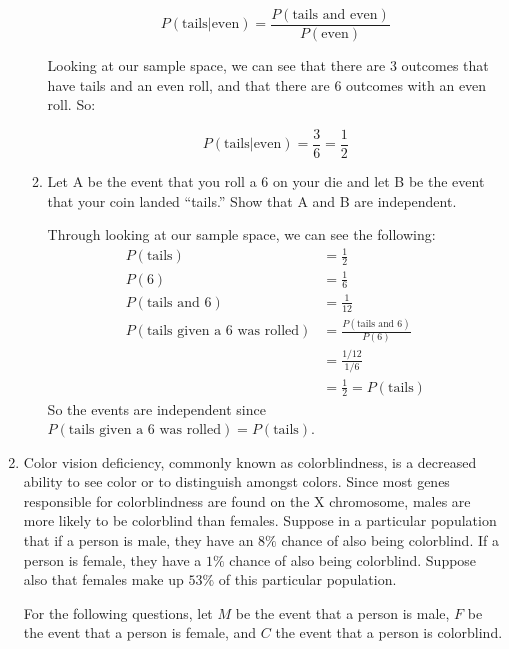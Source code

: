 \documentclass{article}
\begin{document}
\begin{enumerate}
\begin{enumerate}[label= (\alph*)]
            \[P(\text{tails}|\text{even})=\frac{P(\text{tails and even})}{P(\text{even})}\]

            Looking at our sample space, we can see that there are $3$ outcomes
            that have tails and an even roll, and that there are $6$ outcomes
            with an even roll. So:

            \[P(\text{tails}|\text{even})=\frac{3}{6}=\frac{1}{2}\]

            \item Let A be the event that you roll a 6 on your die and let B be the event that your coin
            landed “tails.” Show that A and B are independent.

            Through looking at our sample space, we can see the following:
            \begin{align*} 
                P(\text{tails})&=\frac{1}{2}\\
                P(6)&=\frac{1}{6}\\
                P(\text{tails and 6})&= \frac{1}{12}\\
                P(\text{tails given a 6 was rolled})&=\frac{P(\text{tails and 6})}{P(6)}\\
                &=\frac{1/12}{1/6}\\
                &=\frac{1}{2}=P(\text{tails})
            \end{align*}
            So the events are independent since 
            $P(\text{tails given a 6 was rolled})=P(\text{tails})$.

        \end{enumerate}
        \newpage
    \item Color vision deficiency, commonly known as colorblindness, is a decreased ability to
        see color or to distinguish amongst colors. Since most genes responsible for
        colorblindness are found on the X chromosome, males are more likely to be colorblind
        than females. Suppose in a particular population that if a person is male, they have an
        $8\%$ chance of also being colorblind. If a person is female, they have a $1\%$ chance of
        also being colorblind. Suppose also that females make up $53\%$ of this particular
        population.

        For the following questions, let $M$ be the event that a person is male,
        $F$ be the event that a person is female, and $C$ the event that a person
        is colorblind.
        

\end{enumerate}
\end{document}
